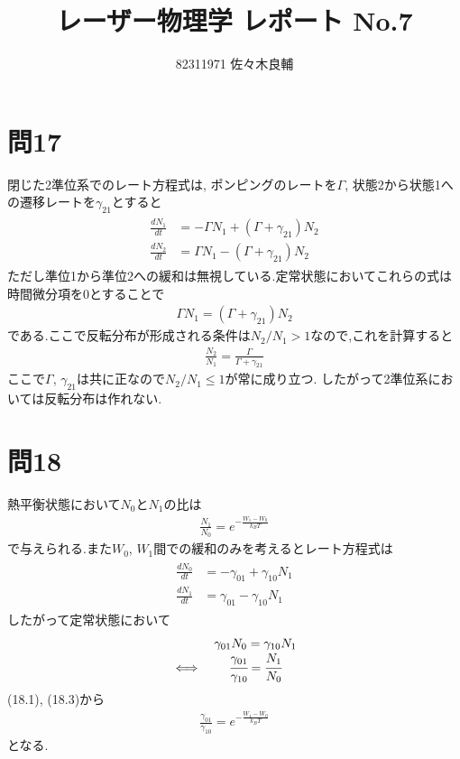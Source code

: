 \documentclass[uplatex,a4j,11pt,dvipdfmx]{jsarticle}
\begin{document}
\title{レーザー物理学 レポート No.7}
\author{82311971 佐々木良輔}
\date{}
\maketitle
\section*{問17}
\setcounter{section}{17}
\setcounter{equation}{0}
閉じた2準位系でのレート方程式は, ポンピングのレートを$\Gamma$, 状態2から状態1への遷移レートを$\gamma_{21}$とすると
\begin{align}
  \begin{split}
    \frac{dN_1}{dt}&=-\Gamma N_1+(\Gamma+\gamma_{21})N_2\\
    \frac{dN_2}{dt}&=\Gamma N_1-(\Gamma+\gamma_{21})N_2
  \end{split}
\end{align}
ただし準位1から準位2への緩和は無視している.定常状態においてこれらの式は時間微分項を0とすることで
\begin{align}
  \Gamma N_1=(\Gamma+\gamma_{21})N_2
\end{align}
である.ここで反転分布が形成される条件は$N_2/N_1>1$なので,これを計算すると
\begin{align}
  \frac{N_2}{N_1}=\frac{\Gamma}{\Gamma+\gamma_{21}}
\end{align}
ここで$\Gamma$, $\gamma_{21}$は共に正なので$N_2/N_1\leq 1$が常に成り立つ.
したがって2準位系においては反転分布は作れない.
\section*{問18}
\setcounter{section}{18}
\setcounter{equation}{0}
熱平衡状態において$N_0$と$N_1$の比は
\begin{align}
  \frac{N_1}{N_0}=e^{-\frac{W_1-W_0}{k_BT}}
\end{align}
で与えられる.また$W_0$, $W_1$間での緩和のみを考えるとレート方程式は
\begin{align}
  \begin{split}
    \frac{dN_0}{dt}&=-\gamma_{01}+\gamma_{10}N_1\\
    \frac{dN_1}{dt}&=\gamma_{01}-\gamma_{10}N_1
  \end{split}
\end{align}
したがって定常状態において
\begin{align}
  \begin{array}{cc}
    &\gamma_{01}N_0=\gamma_{10}N_1\\
    \iff&\cfrac{\gamma_{01}}{\gamma_{10}}=\cfrac{N_1}{N_0}
  \end{array}
\end{align}
(18.1), (18.3)から
\begin{align}
  \frac{\gamma_{01}}{\gamma_{10}}=e^{-\frac{W_1-W_0}{k_BT}}
\end{align}
となる.
\end{document}
